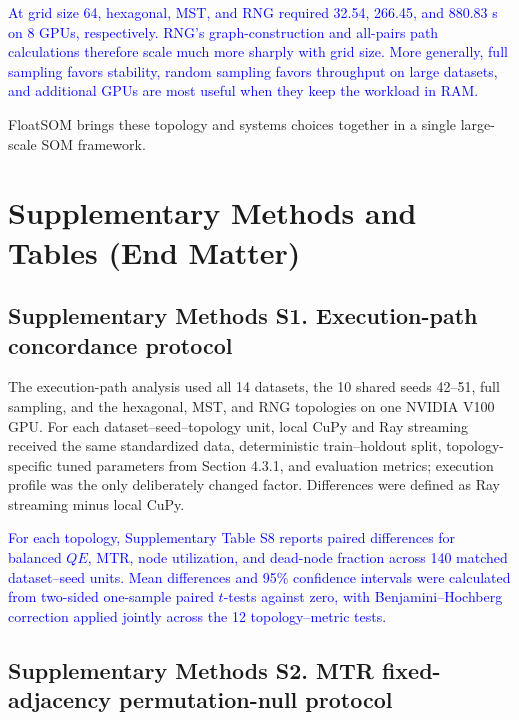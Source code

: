 \documentclass[10pt]{article} %
\newcommand{\TrackedChange}[1]{\textcolor{blue}{#1}}
\begin{document}
\TrackedChange{At grid size 64, hexagonal, MST, and RNG required 32.54, 266.45, and 880.83 s on 8 GPUs, respectively. RNG's graph-construction and all-pairs path calculations therefore scale much more sharply with grid size. More generally, full sampling favors stability, random sampling favors throughput on large datasets, and additional GPUs are most useful when they keep the workload in RAM.}

FloatSOM brings these topology and systems choices together in a single large-scale SOM framework.




\clearpage

\appendix
\section{Supplementary Methods and Tables (End Matter)}

\subsection{Supplementary Methods S1. Execution-path concordance protocol}

The execution-path analysis used all 14 datasets, the 10 shared seeds 42--51, full sampling, and the hexagonal, MST, and RNG topologies on one NVIDIA V100 GPU. For each dataset--seed--topology unit, local CuPy and Ray streaming received the same standardized data, deterministic train--holdout split, topology-specific tuned parameters from Section 4.3.1, and evaluation metrics; execution profile was the only deliberately changed factor. Differences were defined as Ray streaming minus local CuPy.

\TrackedChange{For each topology, Supplementary Table S8 reports paired differences for balanced $QE$, MTR, node utilization, and dead-node fraction across 140 matched dataset--seed units. Mean differences and 95\% confidence intervals were calculated from two-sided one-sample paired $t$-tests against zero, with Benjamini--Hochberg correction applied jointly across the 12 topology--metric tests.}

\subsection{Supplementary Methods S2. MTR fixed-adjacency permutation-null protocol}
\end{document}
